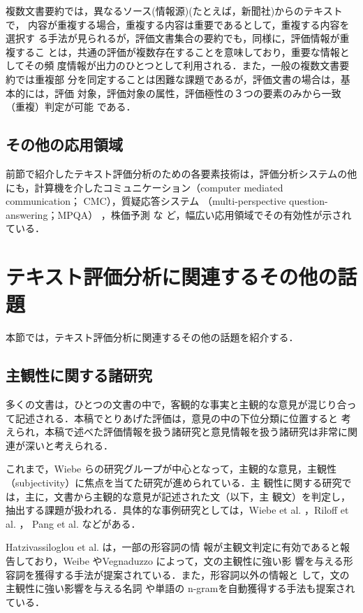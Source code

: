 複数文書要約では，異なるソース(情報源)(たとえば，新聞社)からのテキストで，
内容が重複する場合，重複する内容は重要であるとして，重複する内容を選択す
る手法が見られるが，評価文書集合の要約でも，同様に，評価情報が重複するこ
とは，共通の評価が複数存在することを意味しており，重要な情報としてその頻
度情報が出力のひとつとして利用される．また，一般の複数文書要約では重複部
分を同定することは困難な課題であるが，評価文書の場合は，基本的には，評価
対象，評価対象の属性，評価極性の３つの要素のみから一致（重複）判定が可能
である．

\subsection{その他の応用領域}

前節で紹介したテキスト評価分析のための各要素技術は，評価分析システムの他
にも，計算機を介したコミュニケーション（computer mediated communication；
CMC）\cite{boucouvalas2002a,liu2003a}，質疑応答システム
（multi-perspective question-answering；MPQA）
\cite{cardie2003a,stoyanov2004a}，株価予測\cite{koppel2004a,das2001a} な
ど，幅広い応用領域でその有効性が示されている．

\section{テキスト評価分析に関連するその他の話題}
\label{sec:kanren}

本節では，テキスト評価分析に関連するその他の話題を紹介する．

\subsection{主観性に関する諸研究}
\label{sec:opi_sent}

多くの文書は，ひとつの文書の中で，客観的な事実と主観的な意見が混じり合っ
て記述される．本稿でとりあげた評価は，意見の中の下位分類に位置すると
考えられ，本稿で述べた評価情報を扱う諸研究と意見情報を扱う諸研究は非常に関
連が深いと考えられる．

これまで，Wiebe らの研究グループが中心となって，主観的な意見，主観性
（subjectivity）に焦点を当てた研究が進められている\cite{wiebe2004a}．主
観性に関する研究では，主に，文書から主観的な意見が記述された文（以下，主
観文）を判定し，抽出する課題が扱われる．具体的な事例研究としては，Wiebe
et al. \cite{wiebe1999a}，Riloff et al. \cite{riloff2003b}， Pang et
al. \cite{pang2004a}などがある．

Hatzivassiloglou et al. \cite{hatzivassiloglou2000a}は，一部の形容詞の情
報が主観文判定に有効であると報告しており，Weibe \cite{wiebe2000a} 
やVegnaduzzo \cite{vegnaduzzo2004a} によって，文の主観性に強い影
響を与える形容詞を獲得する手法が提案されている．また，形容詞以外の情報と
して，文の主観性に強い影響を与える名詞 \cite{riloff2003a}や単語の 
n-gram\cite{wiebe2001a}を自動獲得する手法も提案されている．

